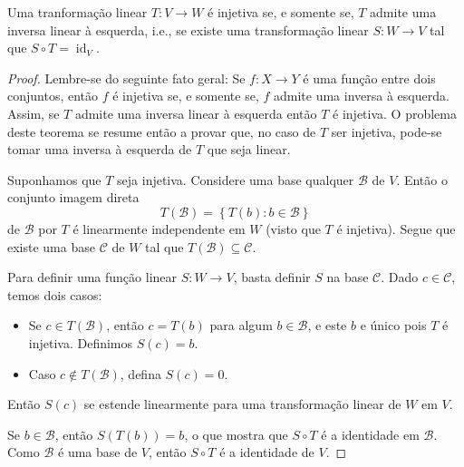 \begin{theorem}
	Uma tranformação linear $T\colon V\to W$ é injetiva se, e somente se, $T$ admite uma inversa linear à esquerda, i.e., se existe uma transformação linear $S\colon W\to V$ tal que $S\circ T=\operatorname{id}_V$.
\end{theorem}

\begin{proof}
	Lembre-se do seguinte fato geral: Se $f\colon X\to Y$ é uma função entre dois conjuntos, então $f$ é injetiva se, e somente se, $f$ admite uma inversa à esquerda. Assim, se $T$ admite uma inversa linear à esquerda então $T$ é injetiva. O problema deste teorema se resume então a provar que, no caso de $T$ ser injetiva, pode-se tomar uma inversa à esquerda de $T$ que seja linear.
	
	Suponhamos que $T$ seja injetiva. Considere uma base qualquer $\mathcal{B}$ de $V$. Então o conjunto imagem direta
	\[T(\mathcal{B})=\left\{T(b):b\in\mathcal{B}\right\}\]
	de $\mathcal{B}$ por $T$ é linearmente independente em $W$ (visto que $T$ é injetiva). Segue que existe uma base $\mathcal{C}$ de $W$ tal que $T(\mathcal{B})\subseteq\mathcal{C}$.
	
	Para definir uma função linear $S\colon W\to V$, basta definir $S$ na base $\mathcal{C}$. Dado $c\in\mathcal{C}$, temos dois casos:
	\begin{itemize}
		\item Se $c\in T(\mathcal{B})$, então $c=T(b)$ para algum $b\in\mathcal{B}$, e este $b$ e único pois $T$ é injetiva. Definimos $S(c)=b$.
		\item Caso $c\not\in T(\mathcal{B})$, defina $S(c)=0$.
	\end{itemize}
	
	Então $S(c)$ se estende linearmente para uma transformação linear de $W$ em $V$.
	
	Se $b\in\mathcal{B}$, então $S(T(b))=b$, o que mostra que $S\circ T$ é a identidade em $\mathcal{B}$. Como $\mathcal{B}$ é uma base de $V$, então $S\circ T$ é a identidade de $V$.
\end{proof}